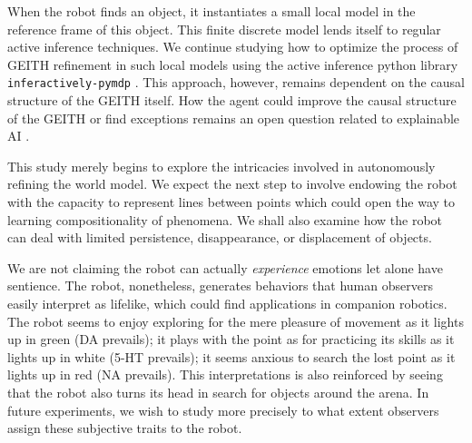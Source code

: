 \documentclass[runningheads]{llncs}
\begin{document}
When the robot finds an object, it instantiates a small local model in the reference frame of this object. 
This finite discrete model lends itself to regular active inference techniques. 
We continue studying how to optimize the process of GEITH refinement in such local models using the active inference python library  \texttt{inferac\-tively-pymdp} \cite{Heins2022}.
This approach, however, remains dependent on the causal structure of the GEITH itself.
How the agent could improve the causal structure of the GEITH or find exceptions remains an open question related to explainable AI \cite{thorisson_explanation_2021}.

This study merely begins to explore the intricacies involved in autonomously refining the world model.
We expect the next step to involve endowing the robot with the capacity to represent lines between points which could open the way to learning compositionality of phenomena. 
We shall also examine how the robot can deal with limited persistence, disappearance, or displacement of objects. 

We are not claiming the robot can actually \textit{experience} emotions let alone have sentience. 
The robot, nonetheless, generates behaviors that human observers easily interpret as lifelike, which could find applications in companion robotics.
The robot seems to enjoy exploring for the mere pleasure of movement as it lights up in green (DA prevails); 
it plays with the point as for practicing its skills as it lights up in white (5-HT prevails); 
it seems anxious to search the lost point as it lights up in red (NA prevails). 
This interpretations is also reinforced by seeing that the robot also turns its head in search for objects around the arena.
In future experiments, we wish to study more precisely to what extent observers assign these subjective traits to the robot.
\end{document}
